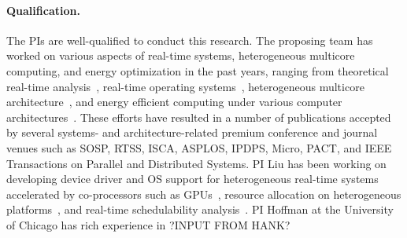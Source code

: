 \paragraph{Qualification.} The PIs are well-qualified to conduct this research. The proposing team has worked on various aspects of real-time systems, heterogeneous multicore computing, and energy optimization in the past years, ranging from theoretical real-time analysis~\cite{?}, real-time operating systems~\cite{?}, heterogeneous multicore architecture~\cite{?}, and energy efficient computing under various computer architectures~\cite{?}. These efforts have resulted in a number of publications accepted by several systems- and architecture-related premium conference and journal venues such as SOSP, RTSS, ISCA, ASPLOS, IPDPS, Micro, PACT, and IEEE Transactions on Parallel and Distributed Systems. 
PI Liu has been working on developing device driver and OS support for heterogeneous real-time systems accelerated by co-processors such as GPUs~\cite{Liu12, liu2009general, liu2008distributed, liu2008pass, liu2007general, liu2008scheduling, liu2008heavyweight, liu2006distributed, liu2009scalable},  resource allocation on heterogeneous platforms~\cite{?}, and real-time schedulability analysis~\cite{Liu1, Liu2, Liu6, Liu7, Liu10, liu2014supporting, elliott1minimizing, hereconfiguration, he2013exploring, Liu3, Liu4, Liu5, Liu9, Liu11, Liu13}.
PI Hoffman at the University of Chicago has rich experience in ?INPUT FROM HANK?